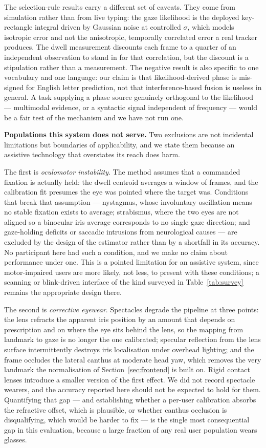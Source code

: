 \documentclass[conference]{IEEEtran}
\begin{document}
The selection-rule results carry a different set of caveats. They come from
simulation rather than from live typing: the gaze likelihood is the deployed
key-rectangle integral driven by Gaussian noise at controlled $\sigma$, which
models isotropic error and not the anisotropic, temporally correlated error a
real tracker produces. The dwell measurement discounts each frame to a quarter
of an independent observation to stand in for that correlation, but the discount
is a stipulation rather than a measurement. The negative result is also specific
to one vocabulary and one language: our claim is that likelihood-derived phase
is mis-signed for English letter prediction, not that interference-based fusion
is useless in general. A task supplying a phase source genuinely orthogonal to
the likelihood --- multimodal evidence, or a syntactic signal independent of
frequency --- would be a fair test of the mechanism and we have not run one.

\textbf{Populations this system does not serve.} Two exclusions are not
incidental limitations but boundaries of applicability, and we state them
because an assistive technology that overstates its reach does harm.

The first is \emph{oculomotor instability}. The method assumes that a
commanded fixation is actually held: the dwell centroid averages a window of
frames, and the calibration fit presumes the eye was pointed where the target
was. Conditions that break that assumption --- nystagmus, whose involuntary
oscillation means no stable fixation exists to average; strabismus, where the
two eyes are not aligned so a binocular iris average corresponds to no single
gaze direction; and gaze-holding deficits or saccadic intrusions from
neurological causes --- are excluded by the design of the estimator rather than
by a shortfall in its accuracy. No participant here had such a condition, and
we make no claim about performance under one. This is a pointed limitation for
an assistive system, since motor-impaired users are more likely, not less, to
present with these conditions; a scanning or blink-driven interface of the kind
surveyed in Table~\ref{tab:survey} remains the appropriate design there.

The second is \emph{corrective eyewear}. Spectacles degrade the pipeline at
three points: the lens refracts the apparent iris position by an amount that
depends on prescription and on where the eye sits behind the lens, so the
mapping from landmark to gaze is no longer the one calibrated; specular
reflection from the lens surface intermittently destroys iris localisation
under overhead lighting; and the frame occludes the lateral canthus at moderate
head yaw, which removes the very landmark the normalisation of
Section~\ref{sec:frontend} is built on. Rigid contact lenses introduce a
smaller version of the first effect. We did not record spectacle wearers, and
the accuracy reported here should not be expected to hold for them. Quantifying
that gap --- and establishing whether a per-user calibration absorbs the
refractive offset, which is plausible, or whether canthus occlusion is
disqualifying, which would be harder to fix --- is the single most consequential
gap in this evaluation, because a large fraction of any real user population
wears glasses.
\end{document}
